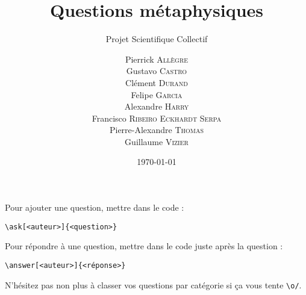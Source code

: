 \documentclass[a4paper, 11pt]{article}
\title{Questions métaphysiques}
\author{Pierrick \textsc{Allègre} \\
		Gustavo \textsc{Castro} \\
		Clément \textsc{Durand} \\
		Felipe \textsc{Garcia} \\
		Alexandre \textsc{Harry} \\
		Francisco \textsc{Ribeiro Eckhardt Serpa} \\
		Pierre-Alexandre \textsc{Thomas} \\
		Guillaume \textsc{Vizier}}
\subtitle{Projet Scientifique Collectif}
\date{\today}
\begin{document}
\maketitle


Pour ajouter une question, mettre dans le code :
\begin{verbatim}
\ask[<auteur>]{<question>}
\end{verbatim}

Pour répondre à une question, mettre dans le code juste après la question :
\begin{verbatim}
\answer[<auteur>]{<réponse>}
\end{verbatim}

N'hésitez pas non plus à classer vos questions par catégorie si ça vous tente \verb!\o/!.



\clearpage
\end{document}
